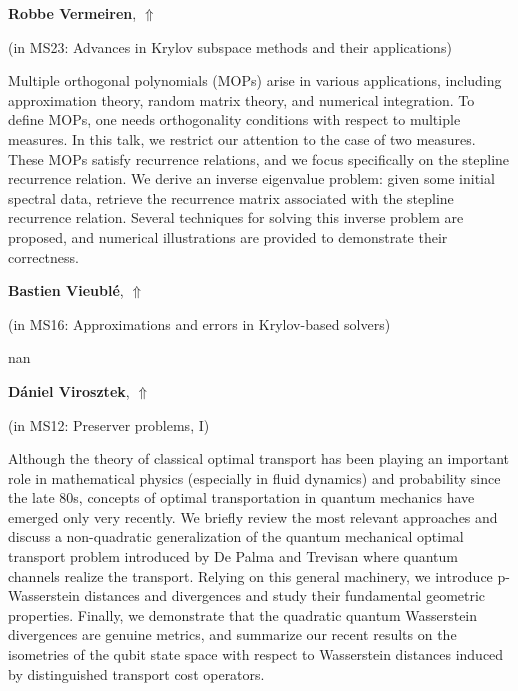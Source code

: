 \documentclass[ILAS2025-program.tex]{subfiles}
\begin{document}
     \hypertarget{down0392}{}\begin{ilasabstract}
    
    \textbf{Robbe Vermeiren},  \hfill \hyperlink{up0392}{$\Uparrow$}
    
    (in {\color{mstitle}MS23: Advances in Krylov subspace methods and their applications})
        
        \mtskip
    Multiple orthogonal polynomials (MOPs) arise in various applications, including approximation theory, random matrix theory, and numerical integration. To define MOPs, one needs orthogonality conditions with respect to multiple measures. In this talk, we restrict our attention to the case of two measures. These MOPs satisfy recurrence relations, and we focus specifically on the stepline recurrence relation.
We derive an inverse eigenvalue problem: given some initial spectral data, retrieve the recurrence matrix associated with the stepline recurrence relation. Several techniques for solving this inverse problem are proposed, and numerical illustrations are provided to demonstrate their correctness.
\end{ilasabstract}
     \hypertarget{down0388}{}\begin{ilasabstract}
    
    \textbf{Bastien Vieublé},  \hfill \hyperlink{up0388}{$\Uparrow$}
    
    (in {\color{mstitle}MS16: Approximations and errors in Krylov-based solvers})
        
        \mtskip
    nan\end{ilasabstract}
     \hypertarget{down0126}{}\begin{ilasabstract}
    
    \textbf{Dániel Virosztek},  \hfill \hyperlink{up0126}{$\Uparrow$}
    
    (in {\color{mstitle}MS12: Preserver problems, I})
        
        \mtskip
    Although the theory of classical optimal transport has been playing an important role in mathematical physics (especially in fluid dynamics) and probability since the late 80s, concepts of optimal transportation in quantum mechanics have emerged only very recently. We briefly review the most relevant approaches and discuss a non-quadratic generalization of the quantum mechanical optimal transport problem introduced by De Palma and Trevisan where quantum channels realize the transport. Relying on this general machinery, we introduce p-Wasserstein distances and divergences and study their fundamental geometric properties. Finally, we demonstrate that the quadratic quantum Wasserstein divergences are genuine metrics, and summarize our recent results on the isometries of the qubit state space with respect to Wasserstein distances induced by distinguished transport cost operators.
\end{ilasabstract}
\end{document}

